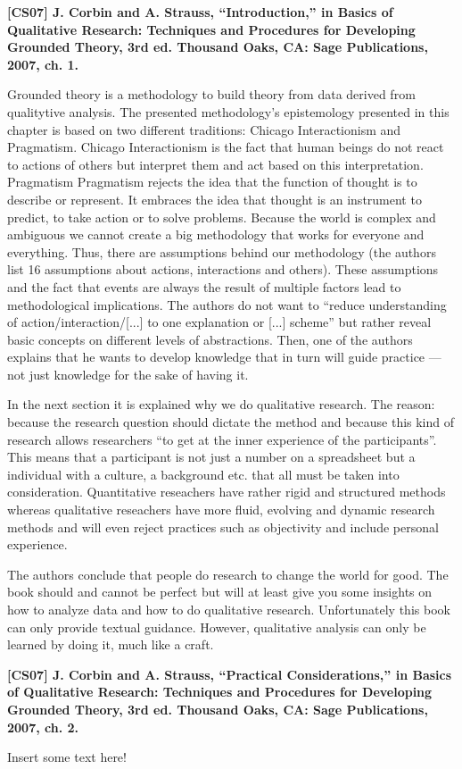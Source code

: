 \documentclass[a4paper,12pt,english]{scrartcl}
\newcommand{\papertitle}[2]{
	\noindent
	\textbf{\textsf{{\large
		[#1] #2
	}}}
	\vspace{2mm}
}
\begin{document}
\pagestyle{fancy} %

\papertitle{CS07}{J. Corbin and A. Strauss, \enquote{Introduction,} in Basics of Qualitative Research: Techniques and Procedures for Developing Grounded Theory, 3rd ed. Thousand Oaks, CA: Sage Publications, 2007, ch. 1.}



Grounded theory is a methodology to build theory from data derived from qualitytive analysis. The presented methodology's epistemology presented in this chapter is based on two different traditions: Chicago Interactionism and Pragmatism. Chicago Interactionism is the fact that human beings do not react to actions of others but interpret them and act based on this interpretation. Pragmatism Pragmatism rejects the idea that the function of thought is to describe or represent. It embraces the idea that thought is an instrument to predict, to take action or to solve problems. Because the world is complex and ambiguous we cannot create a big methodology that works for everyone and everything. Thus, there are assumptions behind our methodology (the authors list 16 assumptions about actions, interactions and others). These assumptions and the fact that events are always the result of multiple factors lead to methodological implications. The authors do not want to \enquote{reduce understanding of action/interaction/[...] to one explanation or [...] scheme} but rather reveal basic concepts on different levels of abstractions. Then, one of the authors explains that he wants to develop knowledge that in turn will guide practice --- not just knowledge for the sake of having it.

In the next section it is explained why we do qualitative research. The reason: because the research question should dictate the method and because this kind of research allows researchers \enquote{to get at the inner experience of the participants}. This means that a participant is not just a number on a spreadsheet but a individual with a culture, a background etc. that all must be taken into consideration. Quantitative reseachers have rather rigid and structured methods whereas qualitative reseachers have more fluid, evolving and dynamic research methods and will even reject practices such as objectivity and include personal experience.

The authors conclude that people do research to change the world for good. The book should and cannot be perfect but will at least give you some insights on how to analyze data and how to do qualitative research. Unfortunately this book can only provide textual guidance. However, qualitative analysis can only be learned by doing it, much like a craft.

\newpage

\papertitle{CS07}{J. Corbin and A. Strauss, \enquote{Practical Considerations,} in Basics of Qualitative Research: Techniques and Procedures for Developing Grounded Theory, 3rd ed. Thousand Oaks, CA: Sage Publications, 2007, ch. 2.}

Insert some text here!
\end{document}
